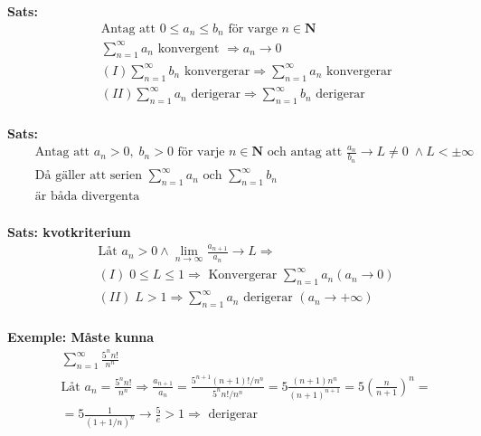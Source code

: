 \documentclass{article}
\begin{document}
\textbf{Sats: }
\begin{align*}
  &\quad  \text{Antag att } 0 \leq a_n \leq b_n \text{ för varge } n\in \mathbf{N} \\
  &\quad  \displaystyle\sum_{n=1}^{\infty}a_n \text{ konvergent } \Rightarrow a_n\to{0} \\
  &\quad  (I) \displaystyle\sum_{n=1}^{\infty}b_n \text{ konvergerar}
  \Rightarrow \displaystyle\sum_{n=1}^{\infty}a_n \text{ konvergerar} \\
  &\quad  (II) \displaystyle\sum_{n=1}^{\infty}a_n \text{ derigerar}
  \Rightarrow \displaystyle\sum_{n=1}^{\infty}b_n \text{ derigerar} \\
\end{align*}


\textbf{Sats: }
\begin{align*}
  &\quad  \text{Antag att } a_n >0, \; b_n >0 \text{ för varje } n \in \mathbf{N} \text{ och antag att } 
  \frac{a_n}{b_n}\to L \neq 0 \; \land L < \pm\infty\\
  &\quad  \text{Då gäller att serien } \displaystyle\sum_{n=1}^{\infty}a_n \text{ och }
  \displaystyle\sum_{n=1}^{\infty}b_n \\
  &\quad  \text{är båda divergenta} \\
\end{align*}

\textbf{Sats: kvotkriterium}
\begin{align*}
  &\quad  \text{Låt } a_n>0 \land \lim_{n\to{\infty}}\frac{a_{n+1}}{a_n}\to L \Rightarrow \\
  &\quad  (I) \; 0 \leq L \leq 1 \Rightarrow \text{ Konvergerar } \displaystyle\sum_{n=1}^{\infty}a_n
  (a_n \to 0) \\
  &\quad  (II) \; L>1 \Rightarrow \displaystyle\sum_{n=1}^{\infty}a_n \text{ derigerar }
  (a_n \to +\infty) \\
\end{align*}

\textbf{Exemple: Måste kunna}
\begin{align*}
  &\quad  \displaystyle\sum_{n=1}^{\infty}\frac{5^n n!}{n^n} \\
  &\quad  \text{Låt } a_n = \frac{5^n n!}{n^n} \Rightarrow \frac{a_{n+1}}{a_n} =
  \frac{5^{n+1}(n+1)!/n^n}{5^n n!/n^n} = 5 \frac{(n+1)n^n}{{(n+1)}^{n+1}} = 5 {(\frac{n}{n+1})}^n = \\
  &\quad  = 5 \frac{1}{{(1+1/n)}^n} \to \frac{5}{e} > 1 \Rightarrow \text{ derigerar}\\
\end{align*}
\end{document}
